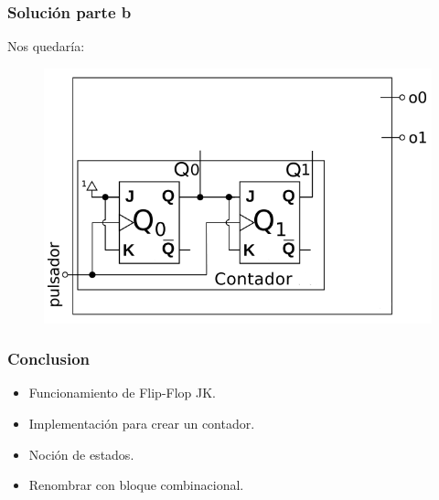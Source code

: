 \documentclass[10pt]{beamer}
\begin{document}
\begin{frame}
\frametitle{Solución parte b}

Nos quedaría:
\begin{figure}[h!]
    \centering
    \includegraphics[scale=0.3]{circuito0.png}
\end{figure}
\end{frame}
\begin{frame}
\frametitle{Conclusion}
\begin{itemize}
  \item Funcionamiento de Flip-Flop JK.\pause
  \item Implementación para crear un contador.\pause
  \item Noción de estados.\pause
  \item Renombrar con bloque combinacional.
\end{itemize}

\end{frame}
\end{document}
